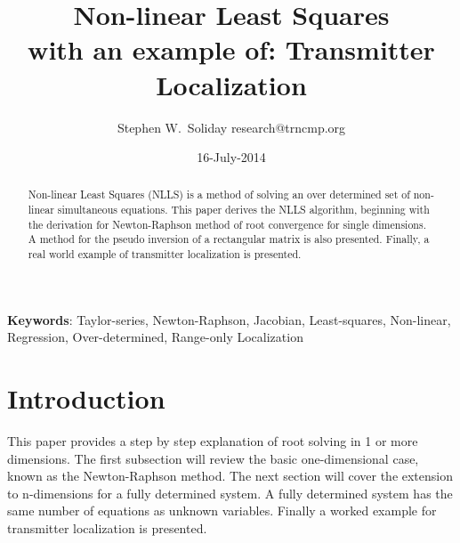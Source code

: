 \documentclass{article}
\begin{document}
%

\title{Non-linear Least Squares \\ with an example of: Transmitter Localization}
\author{ \name Stephen W.~Soliday \email research@trncmp.org %
}
\date{16-July-2014}

\maketitle

\begin{abstract}%
  Non-linear Least Squares (NLLS) is a method of solving an over determined set of 
  non-linear simultaneous equations. 
  This paper derives the NLLS algorithm, beginning with the derivation for 
  Newton-Raphson method of root convergence for single dimensions. 
  A method for the pseudo inversion of a rectangular matrix is also presented. 
  Finally, a real world example of transmitter localization is presented.
\end{abstract}

\vspace{12pt}
\textbf{Keywords}: Taylor-series, Newton-Raphson, Jacobian, Least-squares, Non-linear, 
Regression, Over-determined, Range-only Localization

\section{Introduction\label{sec:intro}}

This paper provides a step by step explanation of root solving in 1 or more dimensions.
The first subsection will review the basic one-dimensional case, known as the 
Newton-Raphson method.
The next section will cover the extension to n-dimensions for a fully determined system.
A fully determined system has the same number of equations as unknown variables.
Finally a worked example for transmitter localization is presented.

\end{document}
